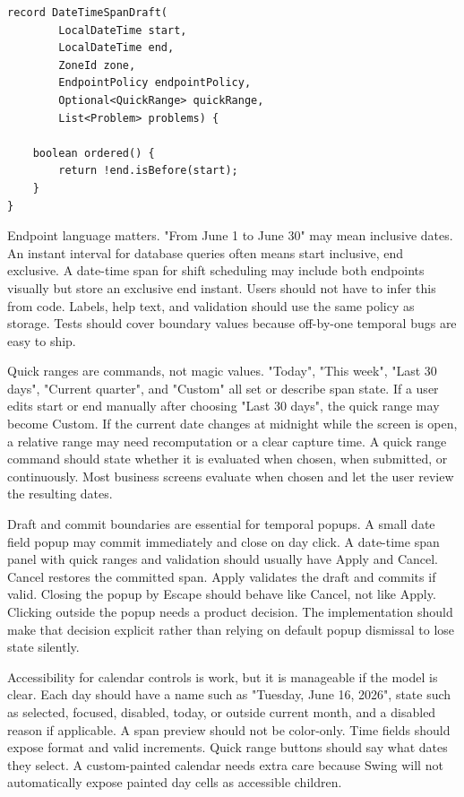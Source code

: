 \begin{lstlisting}[caption={A date-time span has endpoint policy as data.}]
record DateTimeSpanDraft(
        LocalDateTime start,
        LocalDateTime end,
        ZoneId zone,
        EndpointPolicy endpointPolicy,
        Optional<QuickRange> quickRange,
        List<Problem> problems) {

    boolean ordered() {
        return !end.isBefore(start);
    }
}
\end{lstlisting}

Endpoint language matters. "From June 1 to June 30" may mean inclusive dates. An instant
interval for database queries often means start inclusive, end exclusive. A date-time
span for shift scheduling may include both endpoints visually but store an exclusive end
instant. Users should not have to infer this from code. Labels, help text, and
validation should use the same policy as storage. Tests should cover boundary values
because off-by-one temporal bugs are easy to ship.

Quick ranges are commands, not magic values. "Today", "This week", "Last 30 days",
"Current quarter", and "Custom" all set or describe span state. If a user edits start or
end manually after choosing "Last 30 days", the quick range may become Custom. If the
current date changes at midnight while the screen is open, a relative range may need
recomputation or a clear capture time. A quick range command should state whether it is
evaluated when chosen, when submitted, or continuously. Most business screens evaluate
when chosen and let the user review the resulting dates.

Draft and commit boundaries are essential for temporal popups. A small date field popup
may commit immediately and close on day click. A date-time span panel with quick ranges
and validation should usually have Apply and Cancel. Cancel restores the committed span.
Apply validates the draft and commits if valid. Closing the popup by Escape should
behave like Cancel, not like Apply. Clicking outside the popup needs a product decision.
The implementation should make that decision explicit rather than relying on default
popup dismissal to lose state silently.

Accessibility for calendar controls is work, but it is manageable if the model is clear.
Each day should have a name such as "Tuesday, June 16, 2026", state such as selected,
focused, disabled, today, or outside current month, and a disabled reason if applicable.
A span preview should not be color-only. Time fields should expose format and valid
increments. Quick range buttons should say what dates they select. A custom-painted
calendar needs extra care because Swing will not automatically expose painted day cells
as accessible children.

